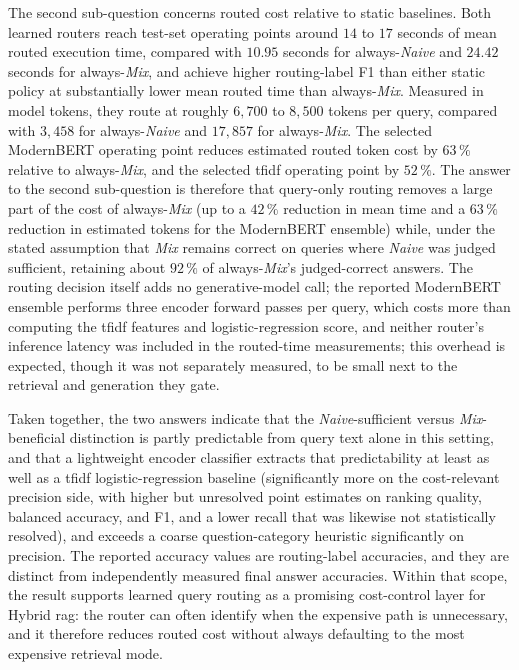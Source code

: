 \documentclass[english, bibtex]{kththesis}               %
\numberwithin{listing}{chapter}
\begin{document}
The second sub-question concerns routed cost relative to static baselines. Both learned routers reach test-set operating points around $14$ to $17$ seconds of mean routed execution time, compared with $10.95$ seconds for always-\emph{Naive} and $24.42$ seconds for always-\emph{Mix}, and achieve higher routing-label F1 than either static policy at substantially lower mean routed time than always-\emph{Mix}. Measured in model tokens, they route at roughly $6{,}700$ to $8{,}500$ tokens per query, compared with $3{,}458$ for always-\emph{Naive} and $17{,}857$ for always-\emph{Mix}. The selected ModernBERT operating point reduces estimated routed token cost by $63\,\%$ relative to always-\emph{Mix}, and the selected \gls{tfidf} operating point by $52\,\%$. The answer to the second sub-question is therefore that query-only routing removes a large part of the cost of always-\emph{Mix} (up to a $42\,\%$ reduction in mean time and a $63\,\%$ reduction in estimated tokens for the ModernBERT ensemble) while, under the stated assumption that \emph{Mix} remains correct on queries where \emph{Naive} was judged sufficient, retaining about $92\,\%$ of always-\emph{Mix}'s judged-correct answers. The routing decision itself adds no generative-model call; the reported ModernBERT ensemble performs three encoder forward passes per query, which costs more than computing the \gls{tfidf} features and logistic-regression score, and neither router's inference latency was included in the routed-time measurements; this overhead is expected, though it was not separately measured, to be small next to the retrieval and generation they gate.

Taken together, the two answers indicate that the \emph{Naive}-sufficient versus \emph{Mix}-beneficial distinction is partly predictable from query text alone in this setting, and that a lightweight encoder classifier extracts that predictability at least as well as a \gls{tfidf} logistic-regression baseline (significantly more on the cost-relevant precision side, with higher but unresolved point estimates on ranking quality, balanced accuracy, and F1, and a lower recall that was likewise not statistically resolved), and exceeds a coarse question-category heuristic significantly on precision. The reported accuracy values are routing-label accuracies, and they are distinct from independently measured final answer accuracies. Within that scope, the result supports learned query routing as a promising cost-control layer for Hybrid \gls{rag}: the router can often identify when the expensive path is unnecessary, and it therefore reduces routed cost without always defaulting to the most expensive retrieval mode.
\end{document}

